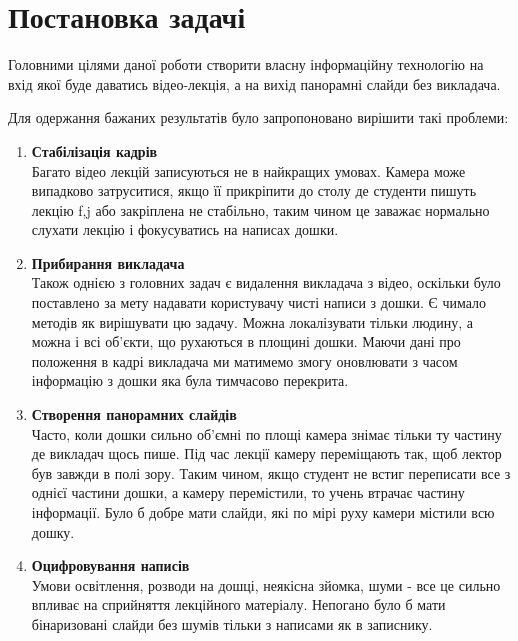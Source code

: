 \section{Постановка задачі}

Головними цілями даної роботи створити власну інформаційну технологію
на вхід якої буде даватись відео-лекція, а на вихід панорамні слайди
без викладача.

Для одержання бажаних результатів було запропоновано
вирішити такі проблеми:
\begin{enumerate}
	\item
	      \textbf{Стабілізація кадрів} \\
	      Багато відео лекцій записуються не в найкращих умовах.
	      Камера може випадково затруситися, якщо її прикріпити до столу
	      де студенти пишуть лекцію f,j або закріплена не стабільно, таким чином
	      це заважає нормально слухати лекцію і фокусуватись на написах дошки.

	\item
	      \textbf{Прибирання викладача} \\
	      Також однією з головних задач є видалення викладача з відео, оскільки
	      було поставлено за мету надавати користувачу чисті написи з дошки.
	      Є чимало методів як вирішувати цю задачу. Можна локалізувати тільки
	      людину, а можна і всі об'єкти, що рухаються в площині дошки. Маючи
	      дані про положення в кадрі викладача ми матимемо змогу оновлювати
	      з часом інформацію з дошки яка була тимчасово перекрита.

	\item
	      \textbf{Створення панорамних слайдів} \\
	      Часто, коли дошки сильно об'ємні по площі камера знімає тільки ту частину де
	      викладач щось пише. Під час лекції камеру переміщають так, щоб лектор був завжди
	      в полі зору. Таким чином, якщо студент не встиг переписати все з однієї частини
	      дошки, а камеру перемістили, то учень втрачає частину інформації. Було б добре
	      мати слайди, які по мірі руху камери містили всю дошку.


	\item
	      \textbf{Оцифровування написів} \\
	      Умови освітлення, розводи на дошці, неякісна зйомка, шуми - все це сильно впливає
	      на сприйняття лекційного матеріалу. Непогано було б мати бінаризовані слайди без
	      шумів тільки з написами як в записнику.

\end{enumerate}


